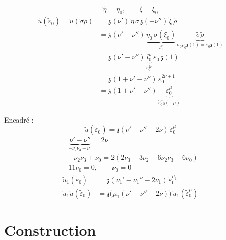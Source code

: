 \documentclass[11pt,a4paper]{article}
\begin{document}
\[
\tilde\eta = \eta_0, \qquad \tilde\xi = \xi_0
\]
\[
\begin{aligned}
\tilde u(\tilde\varepsilon_0) = \tilde u(\tilde\sigma\tilde\rho)
&= \mathfrak{z}(\nu')\,\tilde\eta\,\tilde\sigma\,\mathfrak{z}(-\nu'')\,\tilde\xi\,\tilde\rho \\
&= \mathfrak{z}(\nu' - \nu'')\,\underbrace{\eta_0\,\sigma(\xi_0)}_{l_0^{\nu}}\,
\underbrace{\tilde\sigma\tilde\rho}_{\sigma_0\rho_0\mathfrak{z}(1) = \varepsilon_0\mathfrak{z}(1)} \\
&= \mathfrak{z}(\nu' - \nu'')\,\underbrace{l_0^{\nu}}_{\varepsilon_0^{2\nu}}\,\varepsilon_0\,\mathfrak{z}(1) \\
&= \mathfrak{z}(1 + \nu' - \nu'')\,\varepsilon_0^{2\nu+1} \\
&= \mathfrak{z}(1 + \nu' - \nu'')\,\underbrace{\varepsilon_0^{\mu}}_{\tilde\varepsilon_0^{\mu}\mathfrak{z}(-\mu)}
\end{aligned}
\]

Encadré :
\[
\tilde u(\tilde\varepsilon_0) = \mathfrak{z}(\nu' - \nu'' - 2\nu)\,\tilde\varepsilon_0^{\mu}
\]
\[
\begin{aligned}
&\underbrace{\nu' - \nu''}_{-\nu_2\nu_3 + \nu_0} = 2\nu \\
&-\nu_2\nu_3 + \nu_0 = 2(2\nu_3 - 3\nu_2 - 6\nu_2\nu_3 + 6\nu_0) \\
&11\nu_0 = 0, \qquad \nu_0 = 0
\end{aligned}
\]
\[
\begin{aligned}
\tilde u_1(\tilde\varepsilon_0) &= \mathfrak{z}(\nu_1' - \nu_1'' - 2\nu_1)\,\tilde\varepsilon_0^{\mu_1} \\
\tilde u_1\tilde u(\tilde\varepsilon_0) &= \mathfrak{z}\bigl(\mu_1(\nu' - \nu'' - 2\nu)\bigr)\,\tilde u_1(\tilde\varepsilon_0^{\mu})
\end{aligned}
\]

\section{Construction}
\end{document}

